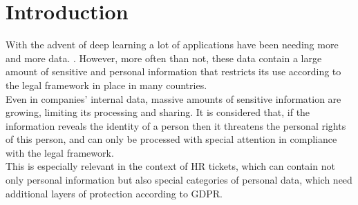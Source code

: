 \chapter{Introduction}
\label{sec:Introduction}


With the advent of deep learning a lot of applications have been needing more and more data. . However, more often than not, these data contain a large amount of sensitive and personal information that restricts its use according to the legal framework in place in many countries. \\
Even in companies’ internal data, massive amounts of sensitive information are growing, limiting its processing and sharing. It is considered that, if the information reveals the identity of a person then it threatens the personal rights of this person, and can only be processed with special attention in compliance with the legal framework. \\
This is especially relevant in the context of HR tickets, which can contain not only personal information but also special categories of personal data, which need additional layers of protection according to GDPR. \\


